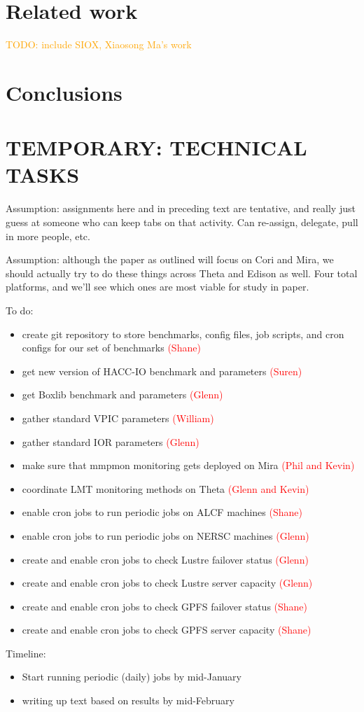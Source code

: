 \documentclass[conference,10pt,compsocconf]{IEEEtran}
\newcommand{\assign}[1]{\textcolor{red}{(#1)}}
\newcommand{\todo}[1]{\textcolor{Orange}{TODO: #1}}
\begin{document}
\section{Related work}

\todo{include SIOX, Xiaosong Ma's work}

\section{Conclusions}

\section{TEMPORARY: TECHNICAL TASKS}

Assumption: assignments here and in preceding text are tentative, and really
just guess at someone who can keep tabs on that activity.  Can re-assign,
delegate, pull in more people, etc.

Assumption: although the paper as outlined will focus on Cori and Mira, we
should actually try to do these things across Theta and Edison as well.  Four
total platforms, and we'll see which ones are most viable for study in paper.

To do:
\begin{itemize}
\item create git repository to store benchmarks, config files, job scripts,
and cron configs for our set of benchmarks \assign{Shane}
\item get new version of HACC-IO benchmark and parameters \assign{Suren}
\item get Boxlib benchmark and parameters \assign{Glenn}
\item gather standard VPIC parameters \assign{William}
\item gather standard IOR parameters \assign{Glenn}
\item make sure that mmpmon monitoring gets deployed on Mira \assign{Phil and
Kevin}
\item coordinate LMT monitoring methods on Theta \assign{Glenn and Kevin}
\item enable cron jobs to run periodic jobs on ALCF machines \assign{Shane}
\item enable cron jobs to run periodic jobs on NERSC machines \assign{Glenn}
\item create and enable cron jobs to check Lustre failover status
\assign{Glenn}
\item create and enable cron jobs to check Lustre server capacity
\assign{Glenn}
\item create and enable cron jobs to check GPFS failover status
\assign{Shane}
\item create and enable cron jobs to check GPFS server capacity
\assign{Shane}

\end{itemize}

Timeline:
\begin{itemize}
\item Start running periodic (daily) jobs by mid-January
\item writing up text based on results by mid-February
\end{itemize}



\end{document}
